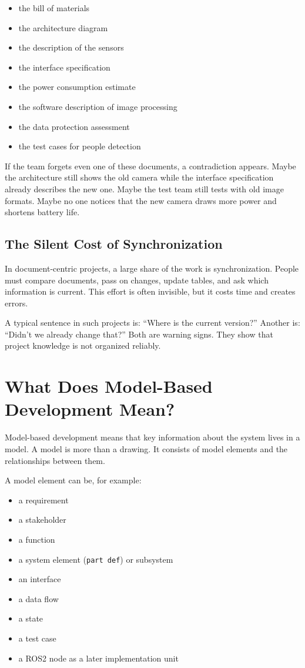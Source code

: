 \begin{itemize}
    \item the bill of materials
    \item the architecture diagram
    \item the description of the sensors
    \item the interface specification
    \item the power consumption estimate
    \item the software description of image processing
    \item the data protection assessment
    \item the test cases for people detection
\end{itemize}

If the team forgets even one of these documents, a contradiction appears. Maybe the architecture still shows the old camera while the interface specification already describes the new one. Maybe the test team still tests with old image formats. Maybe no one notices that the new camera draws more power and shortens battery life.

\subsection{The Silent Cost of Synchronization}
In document-centric projects, a large share of the work is synchronization. People must compare documents, pass on changes, update tables, and ask which information is current. This effort is often invisible, but it costs time and creates errors.

A typical sentence in such projects is: \enquote{Where is the current version?} Another is: \enquote{Didn't we already change that?} Both are warning signs. They show that project knowledge is not organized reliably.

\section{What Does Model-Based Development Mean?}
Model-based development means that key information about the system lives in a model. A model is more than a drawing. It consists of model elements and the relationships between them.

A model element can be, for example:

\begin{itemize}
    \item a requirement
    \item a stakeholder
    \item a function
    \item a system element (\texttt{part def}) or subsystem
    \item an interface
    \item a data flow
    \item a state
    \item a test case
    \item a ROS2 node as a later implementation unit
\end{itemize}

